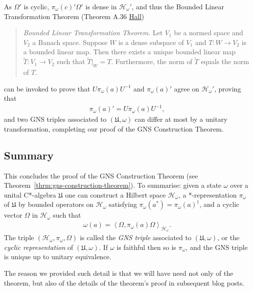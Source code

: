 As $\Omega'$ is cyclic, $\pi_\omega(c)'\Omega'$ is dense in $\mathcal{H}_\omega'$, and thus the  Bounded Linear Transformation Theorem (Theorem A.36 \href{https://doi.org/10.1007/978-1-4614-7116-5}{Hall})

\begin{quote}
    \textit{Bounded Linear Transformation Theorem.} Let $V_1$ be a normed space and $V_2$ a Banach space. Suppose $W$ is a dense subspace of $V_1$ and $T: W \rightarrow V_2$ is a bounded linear map. Then there exists a unique bounded linear map $\widetilde{T}: V_1 \rightarrow V_2$ such that $\widetilde{T}|_W = T$. Furthermore, the norm of $\widetilde{T}$ equals the norm of $T$.
\end{quote}

\noindent can be invoked to prove that $U\pi_\omega(a)U^{-1}$ and $\pi_\omega(a)'$ agree on $\mathcal{H}_\omega'$, proving that
\begin{align}
    \pi_\omega(a)' = U\pi_\omega(a)U^{-1},
\end{align}
and two GNS triples associated to $(\mathfrak{U}, \omega)$ can differ at most by a unitary transformation, completing our proof of the GNS Construction Theorem.

\subsection{Summary}
This concludes the proof of the GNS Construction Theorem (see Theorem~\ref{thrm:gns-construction-theorem}). To summarise: given a state $\omega$ over a unital C*-algebra $\mathfrak{U}$ one can construct a Hilbert space $\mathcal{H}_\omega$, a *-representation $\pi_\omega$ of $\mathfrak{U}$ by bounded operators on $\mathcal{H}_\omega$ satisfying $\pi_\omega(a^*) = \pi_\omega(a)^\dagger$, and a cyclic vector $\Omega$ in $\mathcal{H}_\omega$ such that
\begin{align}
    \omega(a) = \left<\Omega, \pi_\omega(a)\Omega\right>_{\mathcal{H}_\omega}.
\end{align}
The triple $(\mathcal{H}_\omega, \pi_\omega, \Omega)$ is called the \textit{GNS triple} associated to $(\mathfrak{U}, \omega)$, or the \textit{cyclic representation} of $(\mathfrak{U}, \omega)$. If $\omega$ is faithful then so is $\pi_\omega$, and the GNS triple is unique up to unitary equivalence.

\noindent The reason we provided such detail is that we will have need not only of the theorem, but also of the details of the theorem's proof in subsequent blog posts.
